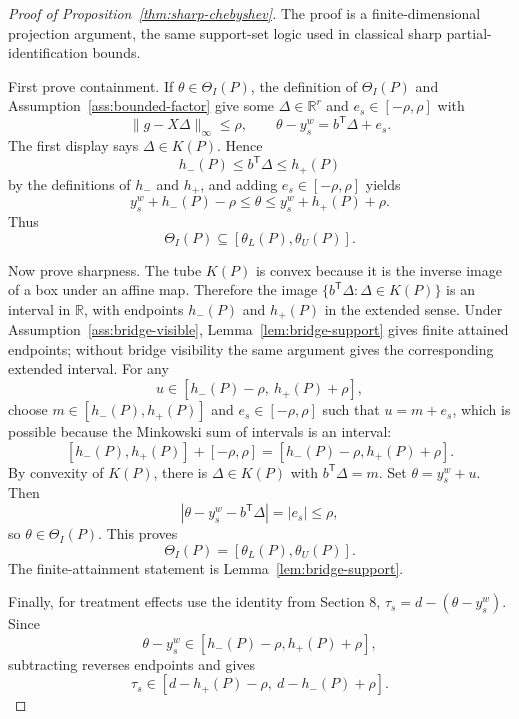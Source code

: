 \documentclass[11pt]{article}
\newcommand{\transpose}{\mathsf{T}}
\newcommand{\R}{\mathbb{R}}
\theoremstyle{definition}
\theoremstyle{plain}
\theoremstyle{remark}
\begin{document}
\begin{proof}[Proof of Proposition~\ref{thm:sharp-chebyshev}]
The proof is a finite-dimensional projection argument, the same support-set
logic used in classical sharp partial-identification bounds.

First prove containment.  If \(\theta\in\Theta_I(P)\), the definition of
\(\Theta_I(P)\) and Assumption~\ref{ass:bounded-factor} give some
\(\Delta\in\R^r\) and \(e_s\in[-\rho,\rho]\) with
\[
\|g-X\Delta\|_\infty\le\rho,\qquad
\theta-y_s^w=b^\transpose\Delta+e_s .
\]
The first display says \(\Delta\in K(P)\).  Hence
\[
h_-(P)\le b^\transpose\Delta\le h_+(P)
\]
by the definitions of \(h_-\) and \(h_+\), and adding
\(e_s\in[-\rho,\rho]\) yields
\[
y_s^w+h_-(P)-\rho
\le \theta \le
y_s^w+h_+(P)+\rho .
\]
Thus
\[
\Theta_I(P)\subseteq [\theta_L(P),\theta_U(P)].
\]

Now prove sharpness.  The tube \(K(P)\) is convex because it is the inverse
image of a box under an affine map.  Therefore the image
\(\{b^\transpose\Delta:\Delta\in K(P)\}\) is an interval in \(\R\), with
endpoints \(h_-(P)\) and \(h_+(P)\) in the extended sense.  Under
Assumption~\ref{ass:bridge-visible}, Lemma~\ref{lem:bridge-support} gives
finite attained endpoints; without bridge visibility the same argument gives
the corresponding extended interval.  For any
\[
u\in[h_-(P)-\rho,\ h_+(P)+\rho],
\]
choose \(m\in[h_-(P),h_+(P)]\) and \(e_s\in[-\rho,\rho]\) such that
\(u=m+e_s\), which is possible because the Minkowski sum of intervals is an
interval:
\[
[h_-(P),h_+(P)]+[-\rho,\rho]
=[h_-(P)-\rho,h_+(P)+\rho].
\]
By convexity of \(K(P)\), there is \(\Delta\in K(P)\) with
\(b^\transpose\Delta=m\).  Set \(\theta=y_s^w+u\).  Then
\[
|\theta-y_s^w-b^\transpose\Delta|=|e_s|\le\rho,
\]
so \(\theta\in\Theta_I(P)\).  This proves
\[
\Theta_I(P)=[\theta_L(P),\theta_U(P)].
\]
The finite-attainment statement is Lemma~\ref{lem:bridge-support}.

Finally, for treatment effects use the identity from Section 8,
\(\tau_s=d-(\theta-y_s^w)\).  Since
\[
\theta-y_s^w\in[h_-(P)-\rho,h_+(P)+\rho],
\]
subtracting reverses endpoints and gives
\[
\tau_s\in[d-h_+(P)-\rho,\ d-h_-(P)+\rho].
\]
\end{proof}
\end{document}
